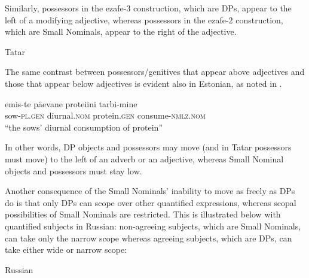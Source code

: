 \documentclass[output=paper]{langsci/langscibook}
\begin{document}
Similarly, possessors in the ezafe-3 construction, which are DPs, appear to the left of a modifying adjective, whereas possessors in the ezafe-2 construction, which are Small Nominals, appear to the right of the adjective.

\ea%
    \label{pereex:key:18}
    Tatar 
    \z
\z

\largerpage
The same contrast between possessors/genitives that appear above adjectives and those that appear below adjectives is evident also in Estonian, 
as noted in \citet{Norris2018}.

\ea%
    \label{pereex:key:19}
    \gll emis-te   päevane   proteiini   tarbi-mine\\
    sow-\textsc{pl.gen}   diurnal.\textsc{nom}   protein.\textsc{gen}   consume-\textsc{nmlz.nom} \\
    \glt “the sows’ diurnal consumption of protein”
\z

In other words, DP objects and possessors may move (and in Tatar possessors must move) to the left of an adverb or an adjective, 
whereas Small Nominal objects and possessors must stay low.

Another consequence of the Small Nominals’ inability to move as freely as DPs do is that only DPs can scope over other quantified expressions, 
whereas scopal possibilities of Small Nominals are restricted. 
This is illustrated below with quantified subjects in Russian: 
non-agreeing subjects, which are Small Nominals, can take only the narrow scope 
whereas agreeing subjects, which are DPs, can take either wide or narrow scope:

\ea%
    \label{pereex:key:20}
    Russian 
    \z 
\z
\end{document}
